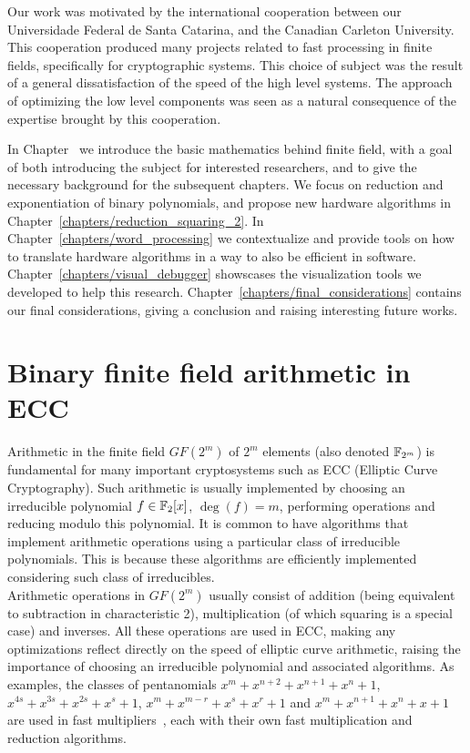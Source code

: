 Our work was motivated by the international cooperation between our Universidade Federal de Santa Catarina, and the Canadian Carleton University. This cooperation produced many projects related to fast processing in finite fields, specifically for cryptographic systems. This choice of subject was the result of a general dissatisfaction of the speed of the high level systems. The approach of optimizing the low level components was seen as a natural consequence of the expertise brought by this cooperation.

In Chapter~\label{cap:background} we introduce the basic mathematics behind finite field, with a goal of both introducing the subject for interested researchers, and to give the necessary background for the subsequent chapters. We focus on reduction and exponentiation of binary polynomials, and propose new hardware algorithms in Chapter~\ref{chapters/reduction_squaring_2}. In Chapter~\ref{chapters/word_processing} we contextualize and provide tools on how to translate hardware algorithms in a way to also be efficient in software. Chapter~\ref{chapters/visual_debugger} showscases the visualization tools we developed to help this research. Chapter~\ref{chapters/final_considerations} contains our final considerations, giving a conclusion and raising interesting future works.


\section{Binary finite field arithmetic in ECC} \label{background:binary}


Arithmetic in the finite field $GF(2^m)$ of $2^m$ elements (also denoted $\mathbb{F}_{2^m}$) is fundamental for many important cryptosystems such as ECC (Elliptic Curve Cryptography). Such arithmetic is usually implemented by choosing an irreducible polynomial $f \in \mathbb{F}_2[x]$, $\deg(f) = m$, performing operations and reducing modulo this polynomial. It is common to have algorithms that implement arithmetic operations using a particular class of irreducible polynomials. This is because these algorithms are efficiently implemented considering such class of irreducibles.\\

Arithmetic operations in $GF(2^m)$ usually consist of addition (being equivalent to subtraction in characteristic 2), multiplication (of which squaring is a special case) and inverses. All these operations are used in ECC, making any optimizations reflect directly on the speed of elliptic curve arithmetic, raising the importance of choosing an irreducible polynomial and associated algorithms. As examples, the classes of pentanomials $x^m+x^{n+2}+x^{n+1}+x^{n}+1$, $x^{4s}+x^{3s}+x^{2s}+x^s+1$, $x^m+x^{m-r}+x^s+x^r+1$ and $x^m+x^{n+1}+x^n+x+1$ are used in fast multipliers~\cite{fan2015survey}, each with their own fast multiplication and reduction algorithms.\\

